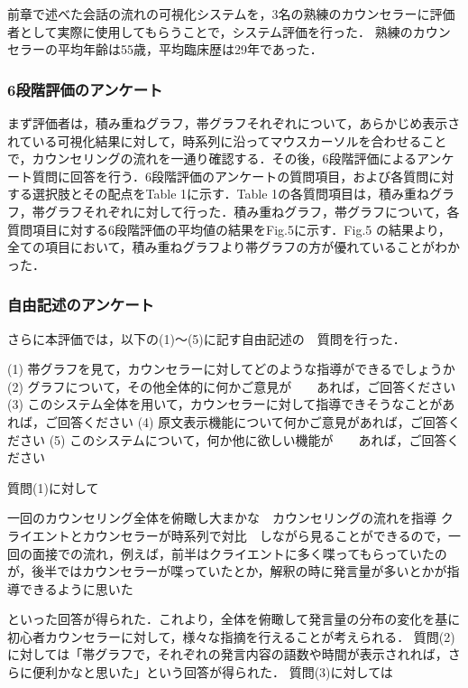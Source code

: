 \documentclass[shuuron]{kuee}
\begin{document}
前章で述べた会話の流れの可視化システムを，3名の熟練のカウンセラーに評価者として実際に使用してもらうことで，システム評価を行った．
熟練のカウンセラーの平均年齢は55歳，平均臨床歴は29年であった．

\subsubsection{6段階評価のアンケート}



まず評価者は，積み重ねグラフ，帯グラフそれぞれについて，あらかじめ表示されている可視化結果に対して，時系列に沿ってマウスカーソルを合わせることで，カウンセリングの流れを一通り確認する．その後，6段階評価によるアンケート質問に回答を行う．6段階評価のアンケートの質問項目，および各質問に対する選択肢とその配点をTable 1に示す．Table 1の各質問項目は，積み重ねグラフ，帯グラフそれぞれに対して行った．積み重ねグラフ，帯グラフについて，各質問項目に対する6段階評価の平均値の結果をFig.5に示す．Fig.5 の結果より，全ての項目において，積み重ねグラフより帯グラフの方が優れていることがわかった．


\subsubsection{自由記述のアンケート}

さらに本評価では，以下の(1)～(5)に記す自由記述の　質問を行った．

(1)	帯グラフを見て，カウンセラーに対してどのような指導ができるでしょうか
(2)	グラフについて，その他全体的に何かご意見が　　あれば，ご回答ください
(3)	このシステム全体を用いて，カウンセラーに対して指導できそうなことがあれば，ご回答ください
(4)	原文表示機能について何かご意見があれば，ご回答ください
(5)	このシステムについて，何か他に欲しい機能が　　あれば，ご回答ください

質問(1)に対して

  一回のカウンセリング全体を俯瞰し大まかな　カウンセリングの流れを指導
  クライエントとカウンセラーが時系列で対比　しながら見ることができるので，一回の面接での流れ，例えば，前半はクライエントに多く喋ってもらっていたのが，後半ではカウンセラーが喋っていたとか，解釈の時に発言量が多いとかが指導できるように思いた

といった回答が得られた．これより，全体を俯瞰して発言量の分布の変化を基に初心者カウンセラーに対して，様々な指摘を行えることが考えられる．
質問(2)に対しては「帯グラフで，それぞれの発言内容の語数や時間が表示されれば，さらに便利かなと思いた」という回答が得られた．
質問(3)に対しては
\end{document}
